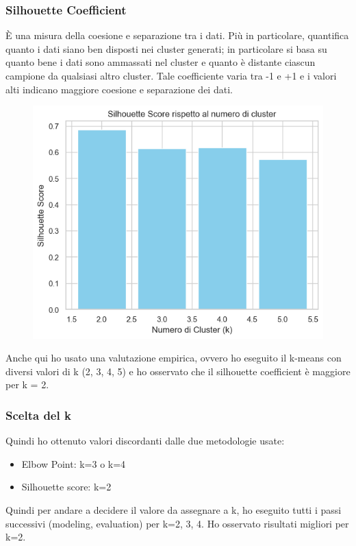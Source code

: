 \documentclass[]{article}
\begin{document}
            \subsubsection{Silhouette Coefficient}
                È una misura della coesione e separazione tra i dati. Più in particolare, quantifica quanto i dati siano ben disposti nei cluster generati; in particolare si basa su quanto bene i dati sono ammassati nel cluster e quanto è distante ciascun campione da qualsiasi altro cluster. Tale coefficiente varia tra -1 e +1 e i valori alti indicano maggiore coesione e separazione dei dati.
                \begin{figure}[H]
                    \centering
                    \includegraphics[width=0.6\linewidth]{images/silhouetteScores.png}
                    \label{fig:enter-label}
                \end{figure}
                Anche qui ho usato una valutazione empirica, ovvero ho eseguito il k-means con diversi valori di k (2, 3, 4, 5) e ho osservato che il silhouette coefficient è maggiore per k = 2.

            \subsubsection{Scelta del k}
                Quindi ho ottenuto valori discordanti dalle due metodologie usate:
                \begin{itemize}
                    \item Elbow Point: k=3 o k=4
                    \item Silhouette score: k=2
                \end{itemize}
                Quindi per andare a decidere il valore da assegnare a k, ho eseguito tutti i passi successivi (modeling, evaluation) per k=2, 3, 4. Ho osservato  risultati migliori per k=2.\\
\end{document}

